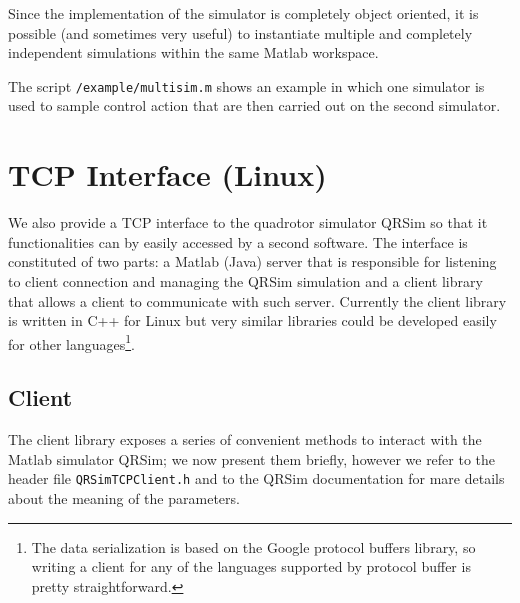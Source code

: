 \documentclass[a4paper,11pt]{report}
\begin{document}
Since the implementation of the simulator is completely object oriented, it is possible (and sometimes very useful) to instantiate multiple and completely independent simulations within the same Matlab workspace.  

The script \texttt{/example/multisim.m} shows an example in which one simulator is used to sample control action that are then carried out on the second simulator. 

\section{TCP Interface (Linux)}

We also provide a TCP interface to the quadrotor simulator QRSim so that it functionalities can by easily accessed by a second software. 
The interface is constituted of two parts: a Matlab (Java) server that is responsible for listening to client connection and managing the QRSim simulation and a client library that allows a client to communicate with such server.
Currently the client library is written in C++ for Linux but very similar libraries could be developed easily for other languages\footnote{The data serialization is based on the Google protocol buffers library, so writing a client for any of the languages supported by protocol buffer is pretty straightforward.}.

\subsection{Client}

The client library exposes a series of convenient methods to interact with the Matlab simulator QRSim; we now present them briefly, however we refer to the header file \texttt{QRSimTCPClient.h} and to the QRSim documentation for mare details about the meaning of the parameters.
\end{document}
